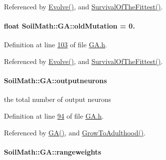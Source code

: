 Referenced by \hyperlink{_g_a_8cpp_source_l00023}{Evolve()}, and \hyperlink{_g_a_8cpp_source_l00189}{Survival\+Of\+The\+Fittest()}.

\hypertarget{class_soil_math_1_1_g_a_a437db38d6fdb7953a5d83f120b020130}{}
\paragraph[{old\+Mutation}]{\setlength{\rightskip}{0pt plus 5cm}float Soil\+Math\+::\+G\+A\+::old\+Mutation = 0.\hspace{0.3cm}{\ttfamily [private]}}\label{class_soil_math_1_1_g_a_a437db38d6fdb7953a5d83f120b020130}


Definition at line \hyperlink{_g_a_8h_source_l00103}{103} of file \hyperlink{_g_a_8h_source}{G\+A.\+h}.



Referenced by \hyperlink{_g_a_8cpp_source_l00023}{Evolve()}, and \hyperlink{_g_a_8cpp_source_l00189}{Survival\+Of\+The\+Fittest()}.

\hypertarget{class_soil_math_1_1_g_a_ab454f9968d5ce2a294b89f85c9d3a74f}{}
\paragraph[{outputneurons}]{ Soil\+Math\+::\+G\+A\+::outputneurons\hspace{0.3cm}{\ttfamily [private]}}\label{class_soil_math_1_1_g_a_ab454f9968d5ce2a294b89f85c9d3a74f}
the total number of output neurons 

Definition at line \hyperlink{_g_a_8h_source_l00094}{94} of file \hyperlink{_g_a_8h_source}{G\+A.\+h}.



Referenced by \hyperlink{_g_a_8cpp_source_l00013}{G\+A()}, and \hyperlink{_g_a_8cpp_source_l00152}{Grow\+To\+Adulthood()}.

\hypertarget{class_soil_math_1_1_g_a_a7613e87f93e42724d03008e3603cf21b}{}
\paragraph[{rangeweights}]{ Soil\+Math\+::\+G\+A\+::rangeweights\hspace{0.3cm}{\ttfamily [private]}}\label{class_soil_math_1_1_g_a_a7613e87f93e42724d03008e3603cf21b}


